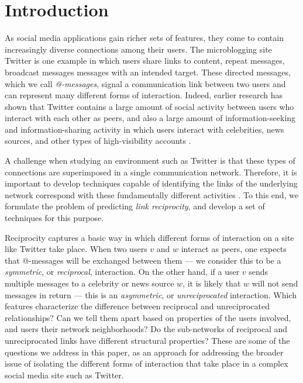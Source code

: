 \documentclass[conference]{IEEEtran}
\begin{document}
\section{Introduction}

As social media applications gain richer sets of features,
they come to contain increasingly diverse 
connections among their users.
The microblogging site Twitter is one example in which users share
links to content, repeat messages, broadcast messages messages with an 
intended target.  These directed messages, which we call \emph{@-messages}, 
signal a communication link between two users and 
can represent many different forms of interaction.
Indeed, earlier research has shown that Twitter contains
a large amount of social activity between users who interact
with each other as peers, and also a large amount of information-seeking
and information-sharing activity in which users interact with
celebrities, news sources, and other types of high-visibility accounts
\cite{kwak-what-is-twitter,romero-directed-closure}.

A challenge when studying an environment such as Twitter
is that these types of connections are superimposed 
in a single communication network.
Therefore, it is important to develop techniques capable of identifying 
the links of the underlying network correspond with these fundamentally different activities .
To this end, we formulate the problem of predicting
{\em link reciprocity}, and develop a set of techniques for this purpose.

Reciprocity captures a basic way in which different forms of
interaction on a site like Twitter take place.
When two users $v$ and $w$ interact as peers, one expects that @-messages
will be exchanged between them --- we consider
this to be a {\em symmetric}, or {\em reciprocal}, interaction.
On the other hand, if a user $v$ sends multiple messages to a
celebrity or news source $w$, it is likely that $w$ will not
send messages in return --- this is an
{\em asymmetric}, or {\em unreciprocated} interaction.
Which features characterize the difference between reciprocal and
unreciprocated relationships?  Can we tell them apart based on
properties of the users involved, and users their network neighborhoods?
Do the sub-networks of reciprocal and unreciprocated links have
different structural properties?
These are some of the questions we address in this paper, as an
approach for addressing the broader issue of isolating the different
forms of interaction that take place in a complex social media 
site such as Twitter.
\end{document}
